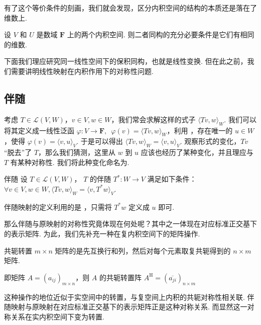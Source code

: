 有了这个等价条件的刻画，我们就会发现，区分内积空间的结构的本质还是落在了维数上.

\begin{theorem}{}{}
    设 $ V $ 和 $ U $ 是数域 $ \mathbf{F} $ 上的两个内积空间. 则二者同构的充分必要条件是它们有相同的维数.
\end{theorem}

下面我们理应研究同一线性空间下的保积同构，也就是线性变换. 但在此之前，我们需要讲明线性映射在内积作用下的对称性问题.

\subsection{伴随}

考虑 $ T \in \mathcal{L}(V, W) $，$ v \in V, w \in W $，我们常会求解这样的式子 $ \langle Tv, w \rangle_W $. 我们可以将其定义成一线性泛函 $ \varphi : V \rightarrow \mathbf{F}, \enspace \varphi (v) = \langle Tv, w \rangle_W $，利用 ，存在唯一的 $ u \in W $，使得 $ \varphi (v) = \langle v, u \rangle_V $. 于是可以得出 $ \langle Tv, w \rangle_W = \langle v, u \rangle_V $. 观察形式的变化，$ Tv $ “脱去”了 $ T $，那么我们猜测，这里从 $ w $ 到 $ u $ 应该也经历了某种变化，并且理应与 $ T $ 有某种对称性. 我们将此种变化命名为.

\begin{definition}{伴随}{} 
    设 $ T \in \mathcal{L}(V, W) $， $ T $ 的伴随 $ T^*: W \rightarrow V $ 满足如下条件： $ \forall v \in V, w \in W, \langle Tv, w \rangle_W = \langle v, T^*w \rangle_V $.
\end{definition}

伴随映射的定义利用的是 ，只需将 $ T^*w $ 定义成 $ u $ 即可.

那么伴随与原映射的对称性究竟体现在何处呢？其中之一体现在对应标准正交基下的表示矩阵. 为此，我们先补充一种在复内积空间下的矩阵操作.

\begin{definition}{共轭转置}{} 
    $ m \times n $ 矩阵的是先互换行和列，然后对每个元素取复共轭得到的 $ n \times m $ 矩阵.

    即矩阵 $ A = (a_{ij})_{m \times n} $，则 $ A $ 的共轭转置阵 $ A^{\mathrm{H}} = (\overline{a_{ji}})_{n \times m} $
\end{definition}

这种操作的地位近似于实空间中的转置，与复空间上内积的共轭对称性相关联. 伴随映射与原映射在对应标准正交基下的表示矩阵正是这种对称关系. 而显然这一对称关系在实内积空间下变为转置.

